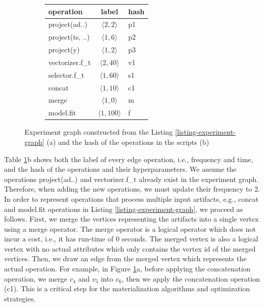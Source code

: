 \begin{figure}
\begin{subfigure}[b]{0.4\linewidth}
\centering

\caption{}
\end{subfigure}%
\begin{subfigure}[b]{0.6\linewidth}
\begin{tabular}{lcl}
\hline
operation & label &  hash \\
\hline
project(ad..) & $\langle 2, 2\rangle$ &p1 \\
project(ts, ..) & $\langle 1, 6\rangle$ & p2\\
project(y) & $\langle 1, 2\rangle$ & p3\\
vectorizer.f\_t & $\langle 2, 40\rangle$ & v1 \\
selector.f\_t & $\langle 1, 60\rangle$ & s1 \\
concat & $\langle 1, 10\rangle$ & c1 \\
merge & $\langle 1, 0 \rangle$ & m\\
model.fit & $\langle 1, 100\rangle$ & f\\
\hline
\end{tabular}
\caption{}
\end{subfigure}
\caption{Experiment graph constructed from the Listing \ref{listing-experiment-graph} (a) and the hash of the operations in the scripts (b)}
\label{fig-experiment-graph}
\end{figure}
Table \ref{fig-experiment-graph}b shows both the label of every edge operation, i.e., frequency and time, and the hash of the operations and their hyperparameters.
We assume the operations project(ad..) and vectorizer.f\_t already exist in the experiment graph.
Therefore, when adding the new operations, we must update their frequency to 2.
In order to represent operations that process multiple input artifacts, e.g., concat and model.fit operations in Listing \ref{listing-experiment-graph}, we proceed as follows.
First, we merge the vertices representing the artifacts into a single vertex using a merge operator.
The merge operator is a logical operator which does not incur a cost, i.e., it has run-time of 0 seconds.
The merged vertex is also a logical vertex with no actual attributes which only contains the vertex id of the merged vertices.
Then, we draw an edge from the merged vertex which represents the actual operation.
For example, in Figure \ref{fig-experiment-graph}a, before applying the concatenation operation, we merge $v_4$ and $v_5$ into $v_6$, then we apply the concatenation operation (c1).
This is a critical step for the materialization algorithms and optimization strategies.

